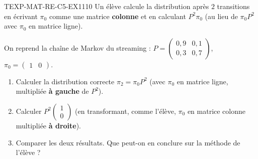

\begin{exercice}{TEXP-MAT-RE-C5-EX1}{1}{10}
Un élève calcule la distribution après $2$ transitions en écrivant $\pi_0$ comme une matrice \textbf{colonne} et en calculant $P^2\pi_0$ (au lieu de $\pi_0P^2$ avec $\pi_0$ en matrice ligne).

On reprend la chaîne de Markov du streaming : $P=\begin{pmatrix}0{,}9&0{,}1\\0{,}3&0{,}7\end{pmatrix}$, $\pi_0=\begin{pmatrix}1&0\end{pmatrix}$.
\begin{enumerate}
  \item Calculer la distribution correcte $\pi_2=\pi_0P^2$ (avec $\pi_0$ en matrice ligne, multipliée \textbf{à gauche} de $P^2$).
  \item Calculer $P^2\begin{pmatrix}1\\0\end{pmatrix}$ (en transformant, comme l'élève, $\pi_0$ en matrice colonne multipliée \textbf{à droite}).
  \item Comparer les deux résultats. Que peut-on en conclure sur la méthode de l'élève ?
\end{enumerate}
\end{exercice}


